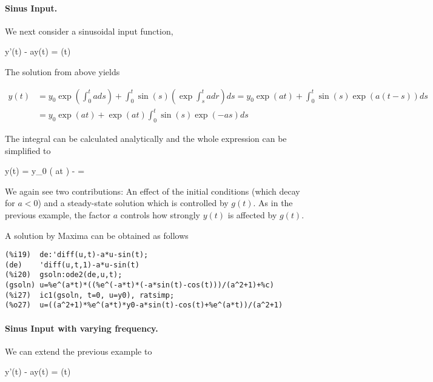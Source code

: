 \paragraph{Sinus Input.} We next consider a sinusoidal input function,

\bee
y'(t) - ay(t) = \sin(t)
\eee

The solution from above yields

\begin{align*}
y(t) &= y_0 \exp \left( \int_0^t a ds \right) + \int_0^t \sin(s) \left( \exp \int_s^t a dr \right) ds = y_0 \exp \left( at \right) + \int_0^t \sin(s) \exp \left( a(t-s) \right) ds \\
&= y_0 \exp \left( at \right) + \exp(at) \int_0^t \sin(s) \exp (-as) ds
\end{align*}

The integral can be calculated analytically and the whole expression can be simplified to

\bee
y(t) = y_0 \exp \left( at \right) -  =  
\eee

We again see two contributions: An effect of the initial conditions (which decay for $a < 0$) and a steady-state solution which is controlled by $g(t)$. As in the previous example, the factor $a$ controls how strongly $y(t)$ is affected by $g(t)$.


A solution by Maxima can be obtained as follows

\begin{verbatim}
(%i19)	de:'diff(u,t)-a*u-sin(t);
(de)	'diff(u,t,1)-a*u-sin(t)
(%i20)	gsoln:ode2(de,u,t);
(gsoln)	u=%e^(a*t)*((%e^(-a*t)*(-a*sin(t)-cos(t)))/(a^2+1)+%c)
(%i27)	ic1(gsoln, t=0, u=y0), ratsimp;
(%o27)	u=((a^2+1)*%e^(a*t)*y0-a*sin(t)-cos(t)+%e^(a*t))/(a^2+1)
\end{verbatim}


\paragraph{Sinus Input with varying frequency.} We can extend the previous example to

\bee
y'(t) - ay(t) = \sin(\omega t)
\eee


